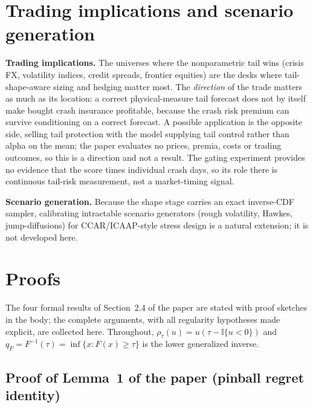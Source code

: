 \documentclass[11pt]{article}
\begin{document}
\section{Trading implications and scenario generation}
\textbf{Trading implications.} The universes where the nonparametric tail wins (crisis FX, volatility indices, credit spreads, frontier equities) are the desks where tail-shape-aware
sizing and hedging matter most. The \emph{direction} of the trade matters
as much as its location: a correct physical-measure tail forecast
does not by itself make bought crash insurance profitable, because the
crash risk premium can survive conditioning on a correct forecast.
A possible application is the opposite side, selling tail protection
with the model supplying tail control rather than alpha on the mean; the
paper evaluates no prices, premia, costs or trading outcomes, so this is a
direction and not a result. The gating experiment provides no evidence that the score times
individual crash days, so its role there is continuous tail-risk
measurement, not a market-timing signal.

\textbf{Scenario generation.} Because the shape stage carries an exact
inverse-CDF sampler, calibrating intractable scenario generators
(rough volatility, Hawkes, jump-diffusions) for CCAR/ICAAP-style
stress design is a natural extension; it is not developed here.



\clearpage
\section{Proofs}\label{app:proofs}

The four formal results of Section~2.4 of the paper are stated with
proof sketches in the body; the complete arguments, with all regularity
hypotheses made explicit, are collected here. Throughout, $\rho_\tau(u)
= u(\tau - \mathbb{I}\{u<0\})$ and $q_F = F^{-1}(\tau) = \inf\{x:F(x)\ge
\tau\}$ is the lower generalized inverse.

\subsection*{Proof of Lemma~1 of the paper (pinball regret identity)}
\end{document}
